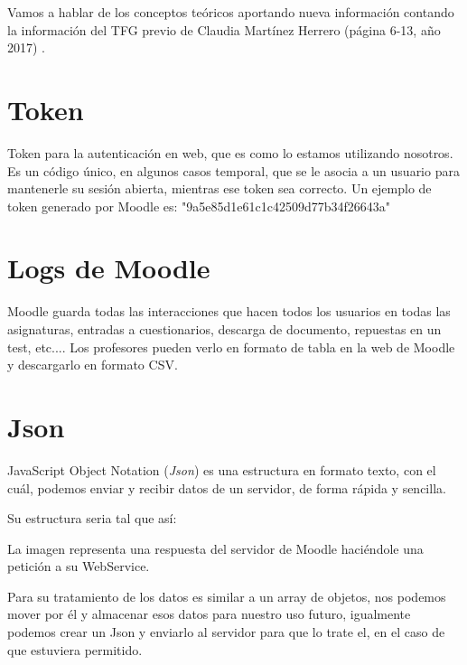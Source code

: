 
Vamos a hablar de los conceptos teóricos aportando nueva información contando la información del TFG previo de Claudia Martínez Herrero (página 6-13, año 2017) \cite{claudia}.




\section{Token}\label{token}

Token para la autenticación en web, que es como lo estamos utilizando nosotros. Es un código único, en algunos casos temporal, que se le asocia a un usuario para mantenerle su sesión abierta, mientras ese token sea correcto. Un ejemplo de token generado por Moodle es: "9a5e85d1e61c1c42509d77b34f26643a"

\section{Logs de Moodle}\label{logs-de-moodle}

Moodle guarda todas las interacciones que hacen todos los usuarios en todas las asignaturas, entradas a cuestionarios, descarga de documento, repuestas en un test, etc.... Los profesores pueden verlo en formato de tabla en la web de Moodle y descargarlo en formato CSV.
\newpage
\section{Json}\label{json}

JavaScript Object Notation (\emph{Json}) es una estructura en formato texto, con el cuál, podemos enviar y recibir datos de un servidor, de forma rápida y sencilla. 

Su estructura seria tal que así:


La imagen representa una respuesta del servidor de Moodle haciéndole una petición a su WebService.

Para su tratamiento de los datos es similar a un array de objetos, nos podemos mover por él y almacenar esos datos para nuestro uso futuro, igualmente podemos crear un Json y enviarlo al servidor para que lo trate el, en el caso de que estuviera permitido.

